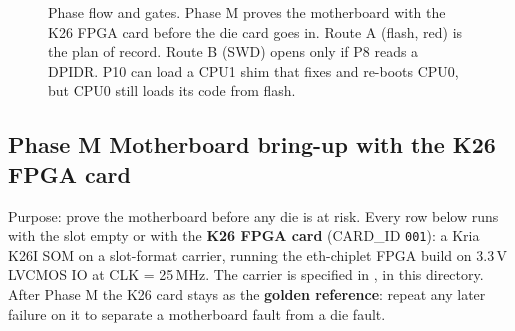 \documentclass[10pt,a4paper]{article}
\begin{document}
\begin{figure}[p]
\caption[Phase flow]{Phase flow and gates. Phase M proves the motherboard with the K26 FPGA card before the die card goes in. Route A (flash, red) is the plan of record. Route B (SWD) opens only if P8 reads a DPIDR. P10 can load a CPU1 shim that fixes  and re-boots CPU0, but CPU0 still loads its code from flash.}
\label{fig:flow}
\end{figure}

\subsection*{Phase M Motherboard bring-up with the K26 FPGA card}
Purpose: prove the motherboard before any die is at risk. Every row below runs with the slot empty or with the \textbf{K26 FPGA card} (CARD\_ID \texttt{001}): a Kria K26I SOM on a slot-format carrier, running the eth-chiplet FPGA build on 3.3\,V LVCMOS IO at CLK = 25\,MHz. The carrier is specified in , in this directory. After Phase M the K26 card stays as the \textbf{golden reference}: repeat any later failure on it to separate a motherboard fault from a die fault.
\end{document}

